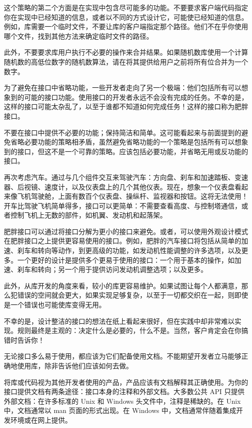 这个策略的第二个方面是在实现中包含尽可能多的功能。不要要求客户端代码指定你在实现中已经知道的信息，或者以不同的方式设计它，可能使已经知道的信息。例如，库需要一个临时文件，不要让库的客户端指定那个路径。他们不在乎你使用哪个文件，找到其他方法来确定临时文件的路径。

此外，不要要求库用户执行不必要的操作来合并结果。如果随机数库使用一个计算随机数的高低位数字的随机数算法，请在将其提供给用户之前将所有位合并为一个数字。


为了避免在接口中省略功能，一些开发者走向了另一个极端：他们包括所有可以想象到的可能的接口功能。使用接口的开发者永远不会没有完成的任务。不幸的是，这样的接口可能太杂乱了，以至于谁都不知道如何完成任务！这样的接口称为肥胖接口。

不要在接口中提供不必要的功能；保持简洁和简单。这可能看起来与前面提到的避免省略必要功能的策略相矛盾，虽然避免省略功能的一个策略是包括所有可以想象到的接口，但这不是一个可靠的策略。应该包括必要功能，并省略无用或反功能的接口。

再次考虑汽车。通过与几个组件交互来驾驶汽车：方向盘、刹车和加速踏板、变速器、后视镜、速度计，以及仪表盘上的几个其他仪表。现在，想象一个仪表盘看起来像飞机驾驶舱，上面有数百个仪表盘、操纵杆、监视器和按钮。这将无法使用！开车比驾驶飞机简单得多，接口可以更简单：不需要查看高度、与控制塔通信，或者控制飞机上无数的部件，如机翼、发动机和起落架。

肥胖接口可以通过将接口分解为更小的接口来避免。或者，可以使用外观设计模式在肥胖接口之上提供更容易使用的接口。例如，肥胖的汽车接口将包括从简单的加速、刹车和转向等动作，到更高级的功能，如发动机性能调整的许多选项，以及更多。一个更好的设计是提供多个更易于使用的接口：一个用于基本的操作，如加速、刹车和转向；另一个用于提供访问发动机调整选项；以及更多。

此外，从库开发的角度来看，较小的库更容易维护。如果试图让每个人都满意，那么犯错误的空间就会更大，如果实现足够复杂，以至于一切都交织在一起，则即使是一个错误也可能使库变得无用。

不幸的是，设计整洁的接口的想法在纸上看起来很好，但在实践中却非常难以实现。规则最终是主观的：决定什么是必要的，什么不是。当然，客户肯定会在你搞错时告诉你！


无论接口多么易于使用，都应该为它们配备使用文档。不能期望开发者立马能够正确地使用库，除非告诉他们应该如何去做。

将库或代码视为其他开发者使用的产品，产品应该有文档解释其正确使用。为你的接口提供文档有两条途径：接口本身的注释和外部文档。大多数公共 API 只提供外部文档：在许多标准的 Unix 和 Windows 头文件中，注释是稀缺的。在 Unix 中，文档通常以 man 页面的形式出现。在 Windows 中，文档通常伴随着集成开发环境或在网上提供。

